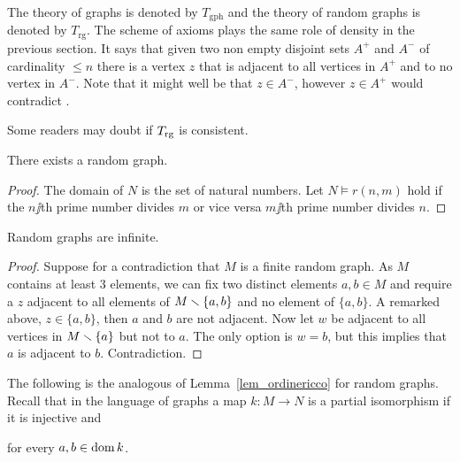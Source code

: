 \documentclass[creche.tex]{subfiles}
\begin{document}
The theory of graphs is denoted by \emph{$T_{\textrm{gph}}$} and the theory of random graphs is denoted by \emph{$T_{\textrm{rg}}$}. The scheme of axioms  plays the same role of density in the previous section.  It says that given two non empty disjoint sets $A^+$ and $A^-$ of cardinality $\le n$ there is a vertex $z$ that is adjacent to all vertices in $A^+$ and to no vertex in $A^-$. Note that it might well be that $z\in A^-$, however $z\in A^+$ would contradict .

Some readers may doubt if $T_{\rm rg}$ is consistent.

\begin{proposition}
There exists a random graph.
\end{proposition}
\begin{proof}
The domain of $N$ is the set of natural numbers. Let $N\models r(n,m)$ hold if the $n\jj$th prime number divides $m$ or vice versa $m\jj$th prime number divides $n$.
\end{proof}



\begin{proposition}
Random graphs are infinite.
\end{proposition}
\begin{proof}
Suppose for a contradiction that $M$ is a finite random graph. As $M$ contains at least $3$ elements, we can fix two distinct elements $a,b\in M$ and require a $z$ adjacent to all elements of $M\smallsetminus\{a,b\}$ and no element of $\{a,b\}$. A remarked above, $z\in\{a,b\}$, then $a$ and $b$ are not adjacent. Now let $w$ be adjacent to all vertices in $M\smallsetminus\{a\}$ but not to $a$. The only option is $w=b$, but this implies that $a$ is adjacent to $b$. Contradiction.
\end{proof}

The following is the analogous of Lemma~\ref{lem_ordinericco} for random graphs. Recall that in the language of graphs a map $k:M\to N$ is a partial isomorphism if it is injective and

\hfill for every $a,b\in\mathop{\rm dom} k$.
\end{document}

